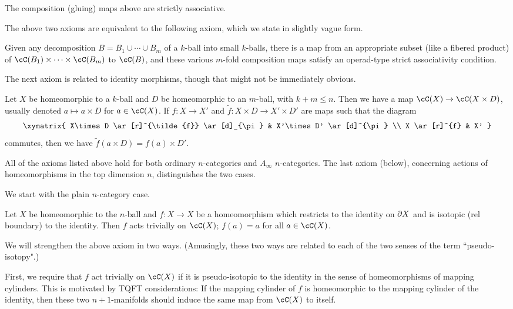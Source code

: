 {The composition (gluing) maps above are strictly associative.}

The above two axioms are equivalent to the following axiom,
which we state in slightly vague form.

{Given any decomposition $B = B_1\cup\cdots\cup B_m$ of a $k$-ball
into small $k$-balls, there is a 
map from an appropriate subset (like a fibered product) 
of $\cC(B_1)\times\cdots\times\cC(B_m)$ to $\cC(B)$,
and these various $m$-fold composition maps satisfy an
operad-type strict associativity condition.}

The next axiom is related to identity morphisms, though that might not be immediately obvious.

{Let $X$ be homeomorphic to a $k$-ball and $D$ be homeomorphic to an $m$-ball, with $k+m \le n$.
Then we have a map $\cC(X)\to \cC(X\times D)$, usually denoted $a\mapsto a\times D$ for $a\in \cC(X)$.
If $f:X\to X'$ and $\tilde{f}:X\times D \to X'\times D'$ are maps such that the diagram
\[ \xymatrix{
	X\times D \ar[r]^{\tilde{f}} \ar[d]_{\pi} & X'\times D' \ar[d]^{\pi} \\
	X \ar[r]^{f} & X'
} \]
commutes, then we have $\tilde{f}(a\times D) = f(a)\times D'$.}


All of the axioms listed above hold for both ordinary $n$-categories and $A_\infty$ $n$-categories.
The last axiom (below), concerning actions of 
homeomorphisms in the top dimension $n$, distinguishes the two cases.

We start with the plain $n$-category case.

{Let $X$ be homeomorphic to the $n$-ball and $f: X\to X$ be a homeomorphism which restricts
to the identity on $\partial X$ and is isotopic (rel boundary) to the identity.
Then $f$ acts trivially on $\cC(X)$; $f(a) = a$ for all $a\in \cC(X)$.}

We will strengthen the above axiom in two ways.
(Amusingly, these two ways are related to each of the two senses of the term
``pseudo-isotopy".)

First, we require that $f$ act trivially on $\cC(X)$ if it is pseudo-isotopic to the identity
in the sense of homeomorphisms of mapping cylinders.
This is motivated by TQFT considerations:
If the mapping cylinder of $f$ is homeomorphic to the mapping cylinder of the identity,
then these two $n{+}1$-manifolds should induce the same map from $\cC(X)$ to itself.

